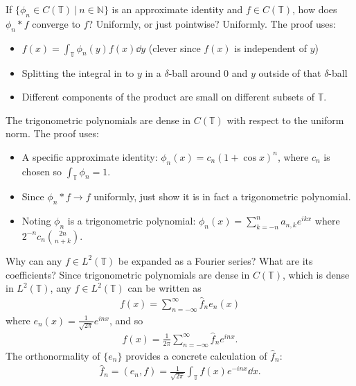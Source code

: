 \documentclass[avery5388,grid,frame]{flashcards}
\def\torus{\mathbb{T}}
\begin{document}
\begin{flashcard}
    {If $\{\phi_n \in C(\torus)\ |\ n \in \mathbb{N}\}$ is an approximate identity and $f \in C(\torus)$, how does $\phi_n * f$ converge to $f$?  Uniformly, or just pointwise?}
    Uniformly.  The proof uses:
    \begin{itemize}
        \item $f(x) = \int_\torus \phi_n(y)f(x)\dd y$ (clever since $f(x)$ is independent of $y$)
        \item Splitting the integral in to $y$ in a $\delta$-ball around $0$ and $y$ outside of that $\delta$-ball
        \item Different components of the product are small on different subsets of $\torus$.
    \end{itemize}
\end{flashcard}

\begin{flashcard}
    {The trigonometric polynomials are dense in $C(\torus)$ with respect to the uniform norm.}
    The proof uses:
    \begin{itemize}
        \item A specific approximate identity: $\phi_n(x) = c_n(1 + \cos x)^n$, where $c_n$ is chosen so $\int_\torus \phi_n = 1$.
        \item Since $\phi_n * f \rightarrow f$ uniformly, just show it is in fact a trigonometric polynomial.
        \item Noting $\phi_n$ is a trigonometric polynomial: $\phi_n(x) = \sum_{k=-n}^n a_{n,k}e^{ikx}$ where $2^{-n}c_n\binom{2n}{n+k}$.
    \end{itemize}
\end{flashcard}

\begin{flashcard}
    {Why can any $f \in L^2(\torus)$ be expanded as a Fourier series?  What are its coefficients?}
    Since trigonometric polynomials are dense in $C(\torus)$, which is dense in $L^2(\torus)$, any $f \in L^2(\torus)$ can be written as
    \begin{align*}
        f(x) = \sum_{n=-\infty}^\infty \hat{f}_ne_n(x)
    \end{align*}
    where $e_n(x) = \frac{1}{\sqrt{2\pi}}e^{inx}$, and so
    \begin{align*}
        f(x) = \frac{1}{2\pi}\sum_{n=-\infty}^\infty \hat{f}_ne^{inx}.
    \end{align*}
    The orthonormality of $\{e_n\}$ provides a concrete calculation of $\hat{f}_n$:
    \begin{align*}
        \hat{f}_n = (e_n, f) = \frac{1}{\sqrt{2\pi}}\int_\torus f(x) e^{-inx}\dd x.
    \end{align*}
\end{flashcard}
\end{document}
